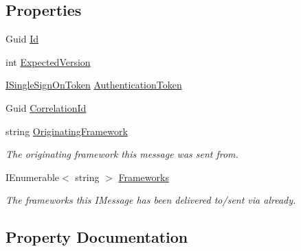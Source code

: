 \subsection*{Properties}
\begin{DoxyCompactItemize}
\item 
Guid \hyperlink{classCqrs_1_1Tests_1_1Substitutes_1_1TestAggregateDoSomething_a950bfb7b4388202574f05f0d1408efc0}{Id}
\item 
int \hyperlink{classCqrs_1_1Tests_1_1Substitutes_1_1TestAggregateDoSomething_a4bfa4361b02c9feb80228dd97810335f}{Expected\+Version}
\item 
\hyperlink{interfaceCqrs_1_1Authentication_1_1ISingleSignOnToken}{I\+Single\+Sign\+On\+Token} \hyperlink{classCqrs_1_1Tests_1_1Substitutes_1_1TestAggregateDoSomething_a8048b53eb7e8b0a889a1fa3c4b28df28}{Authentication\+Token}
\item 
Guid \hyperlink{classCqrs_1_1Tests_1_1Substitutes_1_1TestAggregateDoSomething_ac99d22fe7557e2d0acecc18fc9028a09}{Correlation\+Id}
\item 
string \hyperlink{classCqrs_1_1Tests_1_1Substitutes_1_1TestAggregateDoSomething_ade0f64f6351140f158eddbad9984e5b6}{Originating\+Framework}
\begin{DoxyCompactList}\small\item\em The originating framework this message was sent from. \end{DoxyCompactList}\item 
I\+Enumerable$<$ string $>$ \hyperlink{classCqrs_1_1Tests_1_1Substitutes_1_1TestAggregateDoSomething_a4fbb987df0218d50792d1694de789d8b}{Frameworks}
\begin{DoxyCompactList}\small\item\em The frameworks this I\+Message has been delivered to/sent via already. \end{DoxyCompactList}\end{DoxyCompactItemize}


\subsection{Property Documentation}
\mbox{\label{classCqrs_1_1Tests_1_1Substitutes_1_1TestAggregateDoSomething_a8048b53eb7e8b0a889a1fa3c4b28df28}} 
